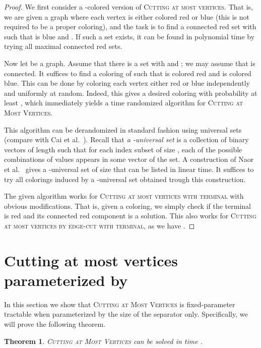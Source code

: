 \documentclass[a4paper,11pt]{article}
\newtheorem{theorem}{Theorem}
\theoremstyle{definition}
\theoremstyle{remark}
\begin{document}
\begin{proof}
We first consider a -colored version of \textsc{Cutting at most  vertices}. That is, we are given a graph  where each vertex is either colored red or blue (this is not required to be a proper coloring), and the task is to find a connected red set  with  such that  is blue and . If such a set exists, it can be found in polynomial time by trying all maximal connected red sets.

Now let  be a graph. Assume that there is a set  with  and ; we may assume that  is connected. It suffices to find a coloring of  such that  is colored red and  is colored blue. This can be done by coloring each vertex  either red or blue independently and uniformly at random. Indeed, this gives a desired coloring with probability at least , which immediately yields a  time randomized algorithm for \textsc{Cutting at Most   Vertices}.

This algorithm can be derandomized in standard fashion using universal sets (compare with Cai et al.~\cite{cai2006random}). Recall that \emph{a -universal set} is a collection of binary vectors of length  such that for each index subset of size , each of the  possible combinations of values appears in some vector of the set. A construction of Naor et al.~\cite{naor1995splitters} gives a -universal set of size  that can be listed in linear time. It suffices to try all colorings induced by a -universal set obtained trough this construction. 

The given algorithm works for \textsc{Cutting at most   vertices with terminal}  with obvious modifications. That is, given a coloring, we simply check if the terminal  is red and its connected red component is a solution. This also works for \textsc{Cutting at most   vertices by edge-cut with terminal}, as we have .
\end{proof}







\section{Cutting at most   vertices parameterized by }

In this section we show that \textsc{Cutting at Most   Vertices} is fixed-parameter tractable when parameterized by the size of the separator  only. 
Specifically, we will prove the following theorem.

\begin{theorem}\label{thm:svc_fpt}
\textsc{Cutting at Most   Vertices}  can be solved in time .
\end{theorem}
\end{document}
